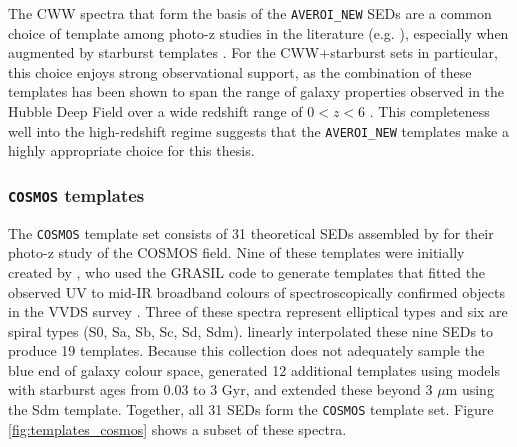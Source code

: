 
The CWW spectra that form the basis of the \texttt{AVEROI\_NEW} SEDs are a common choice of template among photo-z studies in the literature (e.g. \citealt{1999ApJ...513...34F,1999MNRAS.310..540A}), especially when augmented by starburst templates \citep{1997AJ....113....1S,2006ApJS..162...20B,2006A&A...457..841I}. For the CWW+starburst sets in particular, this choice enjoys strong observational support, as the combination of these templates has been shown to span the range of galaxy properties observed in the Hubble Deep Field over a wide redshift range of $0 < z < 6$ \citep{2000ApJ...536..571B,2002MNRAS.330..889F}. This completeness well into the high-redshift regime suggests that the \texttt{AVEROI\_NEW} templates make a highly appropriate choice for this thesis. \par


 

\subsubsection{\texttt{COSMOS} templates}\label{subsubsection:COSMOS}
The \texttt{COSMOS} template set consists of 31 theoretical SEDs assembled by \cite{2009ApJ...690.1236I} for their photo-z study of the COSMOS field. Nine of these templates were initially created by \cite{2007ApJ...663...81P}, who used the GRASIL code \citep{1998ApJ...509..103S} to generate templates that fitted the observed UV to mid-IR broadband colours of spectroscopically confirmed objects in the VVDS survey \citep{2005A&A...439..845L}. Three of these spectra represent elliptical types and six are spiral types (S0, Sa, Sb, Sc, Sd, Sdm). \cite{2009ApJ...690.1236I} linearly interpolated these nine SEDs to produce 19 templates. Because this collection does not adequately sample the blue end of galaxy colour space, \cite{2009ApJ...690.1236I} generated 12 additional templates using \cite{2003MNRAS.344.1000B} models with starburst ages from 0.03 to 3 Gyr, and extended these beyond 3 $\mu$m using the Sdm \cite{2007ApJ...663...81P} template. Together, all 31 SEDs form the \texttt{COSMOS} template set. Figure \ref{fig:templates_cosmos} shows a subset of these spectra.\par 


